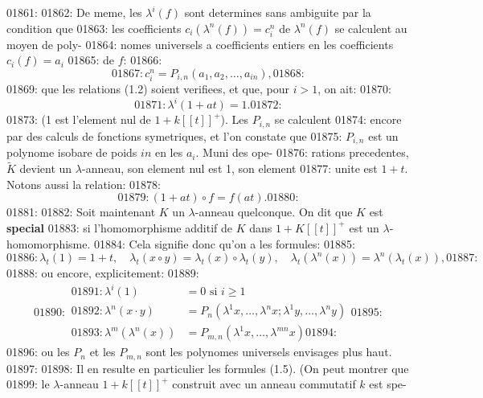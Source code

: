 01861: 
01862: De meme, les $\lambda^i(f)$ sont determines sans ambiguite par la condition que
01863: les coefficients $c_i(\lambda^n(f)) = c_i^n$ de $\lambda^n(f)$ se calculent au moyen de poly-
01864: nomes universels a coefficients entiers en les coefficients $c_i(f) = a_i$
01865: de $f$:
01866: \begin{equation}
01867: c_i^n = P_{i,n}(a_1, a_2, \ldots, a_{in}),
01868: \end{equation}
01869: que les relations (1.2) soient verifiees, et que, pour $i > 1$, on ait:
01870: \begin{equation}
01871: \lambda^i(1 + at) = 1.
01872: \end{equation}
01873: (1 est l'element nul de $1 + k[[t]]^{+}$). Les $P_{i,n}$ se calculent
01874: encore par des calculs de fonctions symetriques, et l'on constate que
01875: $P_{i,n}$ est un polynome isobare de poids $in$ en les $a_i$. Muni des ope-
01876: rations precedentes, $\widetilde{K}$ devient un $\lambda$-anneau, son element nul est 1, son element
01877: unite est $1+t$. Notons aussi la relation:
01878: \begin{equation}
01879: (1 + at) \circ f = f(at).
01880: \end{equation}
01881: 
01882: Soit maintenant $K$ un $\lambda$-anneau quelconque. On dit que $K$ est \textbf{special}
01883: si l'homomorphisme additif de $K$ dans $1 + K[[t]]^{+}$ est un $\lambda$-homomorphisme.
01884: Cela signifie donc qu'on a les formules:
01885: \begin{equation}
01886: \lambda_t(1) = 1 + t, \quad \lambda_t(x \circ y) = \lambda_t(x) \circ \lambda_t(y), \quad \lambda_t(\lambda^n(x)) = \lambda^n(\lambda_t(x)),
01887: \end{equation}
01888: ou encore, explicitement:
01889: \begin{equation}
01890: \begin{aligned}
01891: \lambda^i(1) &= 0 \text{ si } i \geq 1 \\
01892: \lambda^n(x \cdot y) &= P_n(\lambda^1 x, \ldots, \lambda^n x; \lambda^1 y, \ldots, \lambda^n y) \\
01893: \lambda^m(\lambda^n(x)) &= P_{m,n}(\lambda^1 x, \ldots, \lambda^{mn} x)
01894: \end{aligned}
01895: \end{equation}
01896: ou les $P_n$ et les $P_{m,n}$ sont les polynomes universels envisages plus haut.
01897: 
01898: Il en resulte en particulier les formules (1.5). (On peut montrer que
01899: le $\lambda$-anneau $1 + k[[t]]^{+}$ construit avec un anneau commutatif $k$ est spe-
